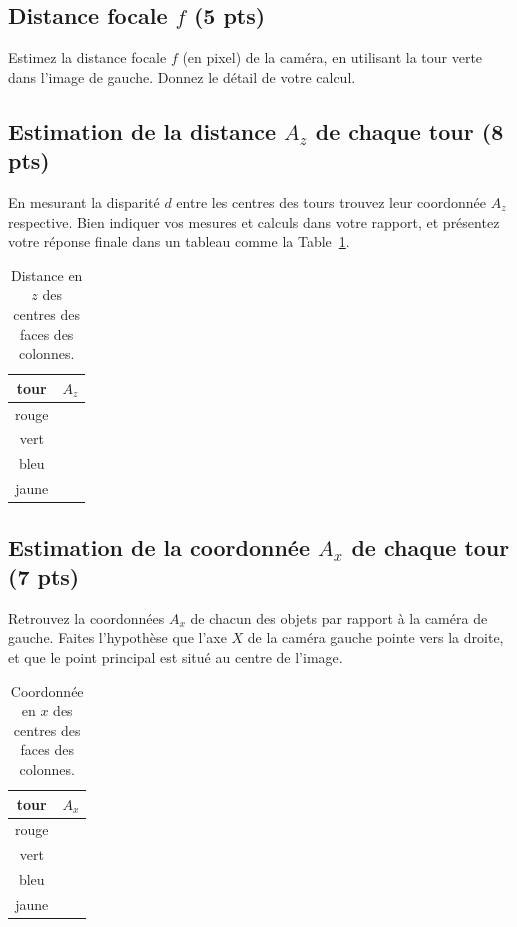 \documentclass[12pt]{article}
\begin{document}
\subsection{Distance focale $f$ (5 pts)}
Estimez la distance focale $f$ (en pixel) de la caméra, en utilisant la tour verte dans l'image de gauche. Donnez le détail de votre calcul.

\subsection{Estimation de la distance $A_z$ de chaque tour (8 pts)}
En mesurant la disparité $d$ entre les centres des tours trouvez leur coordonnée $A_z$ respective. Bien indiquer vos mesures et calculs dans votre rapport, et présentez votre réponse finale dans un tableau comme la Table~\ref{TableCoord}.

\begin{table}[h]
\caption{Distance en $z$ des centres des faces des colonnes.}
\label{TableCoord}
\begin{center}
\begin{tabular}{|c|c|}
\hline
 tour     &    $A_z$ \\
\hline
 rouge      &                          \\
 vert      &                          \\
 bleu      &                            \\
jaune     &                         \\
\hline
\end{tabular}
\end{center}
\end{table}


\subsection{Estimation de la coordonnée $A_x$ de chaque tour (7 pts)}
Retrouvez la coordonnées $A_x$ de chacun des objets par rapport à la caméra de gauche. Faites l'hypothèse que l'axe $X$ de la caméra gauche pointe vers la droite, et que le point principal est situé au centre de l'image. 

\begin{table}[h]
\caption{Coordonnée en $x$ des centres des faces des colonnes.}
\label{TableX}
\begin{center}
\begin{tabular}{|c|c|}
\hline
 tour     &    $A_x$ \\
\hline
 rouge      &                          \\
 vert      &                           \\
 bleu     &                            \\
 jaune     &                         \\
\hline
\end{tabular}
\end{center}
\end{table}
\end{document}
